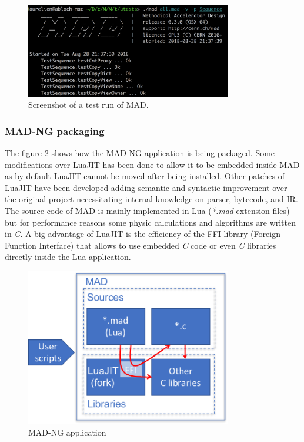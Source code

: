\begin{figure}[H]
    \centering
	\includegraphics[width=0.8\textwidth]{./Images/mad-screenshot}
    \caption{Screenshot of a test run of MAD.}
    \label{fig:mad-screnshot}
\end{figure}

\subsubsection{MAD-NG packaging}
\label{Subsec:mad-pk}

The figure \ref{fig:mad} shows how the MAD-NG application is being packaged. Some
modifications over LuaJIT has been done to allow it to be embedded inside MAD
as by default LuaJIT cannot be moved after being installed. Other patches of
LuaJIT have been developed adding semantic and syntactic improvement over the
original project necessitating internal knowledge on parser, bytecode, and IR.
The source code of MAD is mainly implemented in Lua (\emph{*.mad} extension
files) but for performance reasons some physic calculations and algorithms are
written in \emph{C}. A big advantage of LuaJIT is the efficiency of the FFI
library (Foreign Function Interface) that allows to use embedded \emph{C} code
or even \emph{C} libraries directly inside the Lua application.

\begin{figure}[H]
    \centering
	\includegraphics[width=9cm]{./Images/MAD.pdf}
    \caption{MAD-NG application}
    \label{fig:mad}
\end{figure}

